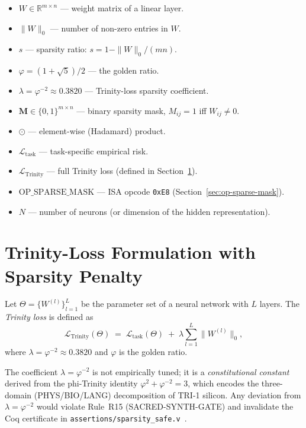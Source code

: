 \begin{itemize}
  \item $W \in \mathbb{R}^{m \times n}$ — weight matrix of a linear layer.
  \item $\|W\|_0$ — number of non-zero entries in $W$.
  \item $s$ — sparsity ratio: $s = 1 - \|W\|_0 / (mn)$.
  \item $\varphi = (1 + \sqrt{5})/2$ — the golden ratio.
  \item $\lambda = \varphi^{-2} \approx 0.3820$ — Trinity-loss sparsity
        coefficient.
  \item $\mathbf{M} \in \{0,1\}^{m \times n}$ — binary sparsity mask,
        $M_{ij} = 1$ iff $W_{ij} \neq 0$.
  \item $\odot$ — element-wise (Hadamard) product.
  \item $\mathcal{L}_{\mathrm{task}}$ — task-specific empirical risk.
  \item $\mathcal{L}_{\mathrm{Trinity}}$ — full Trinity loss (defined in
        Section~\ref{sec:trinity-loss}).
  \item $\mathrm{OP\_SPARSE\_MASK}$ — ISA opcode \texttt{0xE8}
        (Section~\ref{sec:op-sparse-mask}).
  \item $N$ — number of neurons (or dimension of the hidden representation).
\end{itemize}


\section{Trinity-Loss Formulation with Sparsity Penalty}
\label{sec:trinity-loss}

\begin{definition}
\label{def:trinity-loss}
Let $\Theta = \{W^{(l)}\}_{l=1}^{L}$ be the parameter set of a neural network
with $L$ layers.  The \emph{Trinity loss} is defined as
\[
  \mathcal{L}_{\mathrm{Trinity}}(\Theta)
  \;=\;
  \mathcal{L}_{\mathrm{task}}(\Theta)
  \;+\;
  \lambda \sum_{l=1}^{L} \|W^{(l)}\|_0,
\]
where $\lambda = \varphi^{-2} \approx 0.3820$ and $\varphi$ is the golden ratio.
\end{definition}

The coefficient $\lambda = \varphi^{-2}$ is not empirically tuned; it is a
\emph{constitutional constant} derived from the phi-Trinity identity
$\varphi^2 + \varphi^{-2} = 3$, which encodes the three-domain (PHYS/BIO/LANG)
decomposition of TRI-1 silicon.  Any deviation from $\lambda = \varphi^{-2}$
would violate Rule~R15 (SACRED-SYNTH-GATE) and invalidate the Coq certificate
in \texttt{assertions/sparsity\_safe.v}~\cite{evci2020rigging}.

